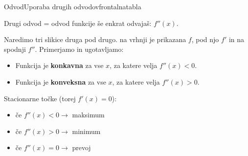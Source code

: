\begin{priprava}{}{}{Odvod}{Uporaba drugih odvodov}{frontalna}{tabla}

Drugi odvod = odvod funkcije še enkrat odvajaš: $ f''(x) $.

Naredimo tri slikice druga pod drugo. na vrhnji je prikazana $ f $, pod njo $ f' $ in na spodnji $ f'' $. Primerjamo in ugotavljamo:

\begin{itemize}
    \item Funkcija je \textbf{konkavna} za vse $ x $, za katere velja $ f''(x) < 0 $.
    \item Funkcija je \textbf{konveksna} za vse $ x $, za katere velja $ f''(x) > 0 $.
\end{itemize}

Stacionarne točke (torej $ f'(x) = 0 $):
\begin{itemize}
    \item če $ f''(x) < 0 \rightarrow $ maksimum
    \item če $ f''(x) > 0 \rightarrow $ minimum
    \item če $ f''(x) = 0 \rightarrow $ prevoj
\end{itemize}

    
\end{priprava}
